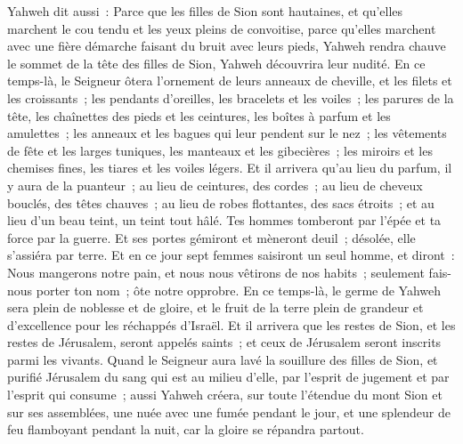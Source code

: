 \begin{multicols}{2}
Yahweh dit aussi~: Parce que les filles de Sion sont hautaines, et qu'elles marchent le cou tendu et les yeux pleins de convoitise, parce qu'elles marchent avec une fière démarche faisant du bruit avec leurs pieds,
Yahweh rendra chauve le sommet de la tête des filles de Sion, Yahweh découvrira leur nudité.
En ce temps-là, le Seigneur ôtera l'ornement de leurs anneaux de cheville, et les filets et les croissants~;
les pendants d'oreilles, les bracelets et les voiles~;
les parures de la tête, les chaînettes des pieds et les ceintures, les boîtes à parfum et les amulettes~;
les anneaux et les bagues qui leur pendent sur le nez~;
les vêtements de fête et les larges tuniques, les manteaux et les gibecières~;
les miroirs et les chemises fines, les tiares et les voiles légers.
Et il arrivera qu'au lieu du parfum, il y aura de la puanteur~; au lieu de ceintures, des cordes~; au lieu de cheveux bouclés, des têtes chauves~; au lieu de robes flottantes, des sacs étroits~; et au lieu d'un beau teint, un teint tout hâlé.
Tes hommes tomberont par l'épée et ta force par la guerre.
Et ses portes gémiront et mèneront deuil~; désolée, elle s'assiéra par terre.
\VerseOne{}Et en ce jour sept femmes saisiront un seul homme, et diront~: Nous mangerons notre pain, et nous nous vêtirons de nos habits~; seulement fais-nous porter ton nom~; ôte notre opprobre.
En ce temps-là, le germe de Yahweh sera plein de noblesse et de gloire, et le fruit de la terre plein de grandeur et d'excellence pour les réchappés d'Israël.
Et il arrivera que les restes de Sion, et les restes de Jérusalem, seront appelés saints~; et ceux de Jérusalem seront inscrits parmi les vivants.
Quand le Seigneur aura lavé la souillure des filles de Sion, et purifié Jérusalem du sang qui est au milieu d'elle, par l'esprit de jugement et par l'esprit qui consume~;
aussi Yahweh créera, sur toute l'étendue du mont Sion et sur ses assemblées, une nuée avec une fumée pendant le jour, et une splendeur de feu flamboyant pendant la nuit, car la gloire se répandra partout.

\end{multicols}
